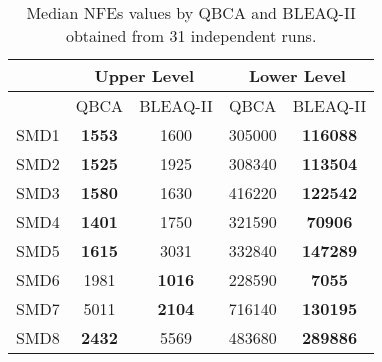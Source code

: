 \documentclass[conference]{IEEEtran}
\theoremstyle{definition}
\begin{document}
\begin{table}[!ht]
    \caption{Median NFEs values by QBCA and BLEAQ-II obtained from 31 independent runs.}
    \label{tab:ul-comparative-fes}
    \centering
    \begin{tabular}{|c|c|c||c|c|}
\hline
& \multicolumn{2}{c||}{Upper Level} & \multicolumn{2}{c|}{Lower Level} \\ \hline
& QBCA & BLEAQ-II & QBCA & BLEAQ-II \\ \hline
SMD1 & \textbf{1553}  & 1600          &  305000 & \textbf{116088} \\ \hline
SMD2 & \textbf{1525}  & 1925          &  308340 & \textbf{113504} \\ \hline
SMD3 & \textbf{1580}  & 1630          &  416220 & \textbf{122542} \\ \hline
SMD4 & \textbf{1401} & 1750  &  321590 & \textbf{70906} \\ \hline
SMD5 & \textbf{1615}  & 3031          &  332840 & \textbf{147289} \\ \hline
SMD6 & 1981 &  \textbf{1016} &   228590& \textbf{7055} \\ \hline
SMD7 & 5011 &  \textbf{2104} & 716140  & \textbf{130195} \\ \hline
SMD8 & \textbf{2432}  & 5569          &  483680 & \textbf{289886} \\ \hline
    \end{tabular}
\end{table}
\end{document}
